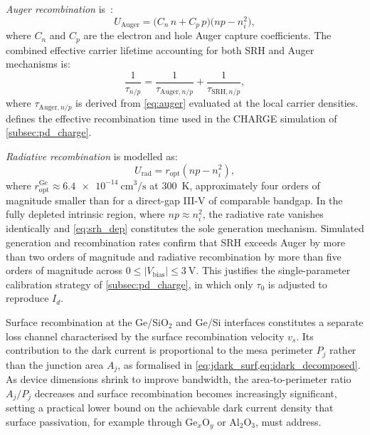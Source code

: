 \emph{Auger recombination} is~\cite{Hamadou2023}:
\begin{equation}
    U_{\mathrm{Auger}}
    = \bigl(C_n\,n + C_p\,p\bigr)\bigl(np - n_i^2\bigr),
    \label{eq:auger}
\end{equation}
where $C_n$ and $C_p$ are the electron and hole Auger capture coefficients.
The combined effective carrier lifetime accounting for both SRH and Auger
mechanisms is:
\begin{equation}
    \frac{1}{\tau_{n/p}}
    = \frac{1}{\tau_{\mathrm{Auger},n/p}}
    + \frac{1}{\tau_{\mathrm{SRH},n/p}},
    \label{eq:lifetime_combined}
\end{equation}
where $\tau_{\mathrm{Auger},n/p}$ is derived from \cref{eq:auger} evaluated
at the local carrier densities.  defines the
effective recombination time used in the CHARGE simulation
of \cref{subsec:pd_charge}.

\emph{Radiative recombination} is modelled as:
\begin{equation}
    U_{\mathrm{rad}} = r_{\mathrm{opt}}\!\left(np - n_i^2\right),
    \label{eq:uradiative}
\end{equation}
where $r_{\mathrm{opt}}^{\mathrm{Ge}}\approx\SI{6.4e-14}{\centi\metre\cubed\per\second}$
at \SI{300}{\kelvin}, approximately four orders of magnitude smaller than for a
direct-gap III-V of comparable bandgap. In the fully depleted intrinsic region,
where $np\approx n_i^2$, the radiative rate vanishes identically and
\cref{eq:srh_dep} constitutes the sole generation mechanism. Simulated generation
and recombination rates confirm that SRH exceeds Auger by more than two orders of
magnitude and radiative recombination by more than five orders of magnitude across
$0\leq|V_{\mathrm{bias}}|\leq\SI{3}{\volt}$. This justifies the single-parameter
calibration strategy of \cref{subsec:pd_charge}, in which only $\tau_0$ is
adjusted to reproduce $I_d$.

Surface recombination at the Ge/SiO$_2$ and Ge/Si interfaces constitutes a
separate loss channel characterised by the surface recombination velocity $v_s$.
Its contribution to the dark current is proportional to the mesa perimeter $P_j$
rather than the junction area $A_j$, as formalised in
\cref{eq:jdark_surf,eq:idark_decomposed}. As device dimensions shrink to improve
bandwidth, the area-to-perimeter ratio $A_j/P_j$ decreases and surface
recombination becomes increasingly significant, setting a practical lower bound
on the achievable dark current density that surface passivation, for example
through Ge$_x$O$_y$ or Al$_2$O$_3$, must address.

